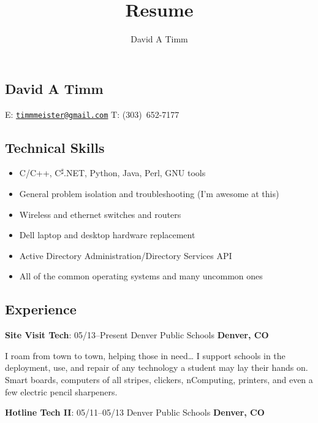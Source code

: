 \documentclass[a4paper,12pt]{article}
\author{David A Timm}
\title{Resume}
\begin{document}
\begin{center}
\section{David A Timm}

E: \href{mailto:timmmeister@gmail.com?subject=You%27re%20hired!}
{\nolinkurl{timmmeister@gmail.com}}
T: \mbox{(303) 652-7177}
\end{center}

\begin{center}
\subsection{Technical Skills}
\end{center}

\begin{itemize}
\item C/C++, C\textsuperscript{{$\sharp$}}.NET, Python, Java, Perl, GNU tools
\item General problem isolation and troubleshooting (I'm awesome at this)
\item Wireless and ethernet switches and routers
\item Dell laptop and desktop hardware replacement
\item Active Directory Administration/Directory Services API
\item All of the common operating systems and many uncommon ones
\end{itemize}

\begin{center}
\subsection{Experience}
\end{center}

\begin{flushleft}
\textbf{Site Visit Tech}: 05/13--Present Denver Public Schools
\textbf{Denver, CO}
\end{flushleft}

I roam from town to town, helping those in need\ldots{} I support schools in the
deployment, use, and repair of any technology a student may lay their hands on.
Smart boards, computers of all stripes, clickers, nComputing, printers, and
even a few electric pencil sharpeners. 

\begin{flushleft}
\textbf{Hotline Tech II}: 05/11--05/13 Denver Public Schools \textbf{Denver, CO}
\end{flushleft}
\end{document}
